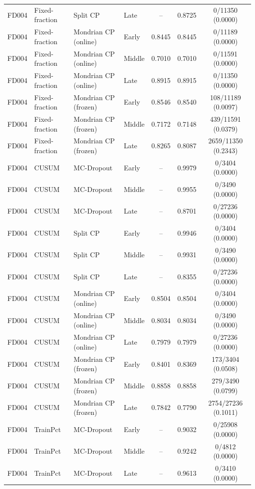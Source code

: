 \begin{table}[t]
\begin{tabular}{llllccc}
FD004 & Fixed-fraction & Split CP & Late & -- & 0.8725 & 0/11350 (0.0000) \\
FD004 & Fixed-fraction & Mondrian CP (online) & Early & 0.8445 & 0.8445 & 0/11189 (0.0000) \\
FD004 & Fixed-fraction & Mondrian CP (online) & Middle & 0.7010 & 0.7010 & 0/11591 (0.0000) \\
FD004 & Fixed-fraction & Mondrian CP (online) & Late & 0.8915 & 0.8915 & 0/11350 (0.0000) \\
FD004 & Fixed-fraction & Mondrian CP (frozen) & Early & 0.8546 & 0.8540 & 108/11189 (0.0097) \\
FD004 & Fixed-fraction & Mondrian CP (frozen) & Middle & 0.7172 & 0.7148 & 439/11591 (0.0379) \\
FD004 & Fixed-fraction & Mondrian CP (frozen) & Late & 0.8265 & 0.8087 & 2659/11350 (0.2343) \\
FD004 & CUSUM & MC-Dropout & Early & -- & 0.9979 & 0/3404 (0.0000) \\
FD004 & CUSUM & MC-Dropout & Middle & -- & 0.9955 & 0/3490 (0.0000) \\
FD004 & CUSUM & MC-Dropout & Late & -- & 0.8701 & 0/27236 (0.0000) \\
FD004 & CUSUM & Split CP & Early & -- & 0.9946 & 0/3404 (0.0000) \\
FD004 & CUSUM & Split CP & Middle & -- & 0.9931 & 0/3490 (0.0000) \\
FD004 & CUSUM & Split CP & Late & -- & 0.8355 & 0/27236 (0.0000) \\
FD004 & CUSUM & Mondrian CP (online) & Early & 0.8504 & 0.8504 & 0/3404 (0.0000) \\
FD004 & CUSUM & Mondrian CP (online) & Middle & 0.8034 & 0.8034 & 0/3490 (0.0000) \\
FD004 & CUSUM & Mondrian CP (online) & Late & 0.7979 & 0.7979 & 0/27236 (0.0000) \\
FD004 & CUSUM & Mondrian CP (frozen) & Early & 0.8401 & 0.8369 & 173/3404 (0.0508) \\
FD004 & CUSUM & Mondrian CP (frozen) & Middle & 0.8858 & 0.8858 & 279/3490 (0.0799) \\
FD004 & CUSUM & Mondrian CP (frozen) & Late & 0.7842 & 0.7790 & 2754/27236 (0.1011) \\
FD004 & TrainPct & MC-Dropout & Early & -- & 0.9032 & 0/25908 (0.0000) \\
FD004 & TrainPct & MC-Dropout & Middle & -- & 0.9242 & 0/4812 (0.0000) \\
FD004 & TrainPct & MC-Dropout & Late & -- & 0.9613 & 0/3410 (0.0000) \\

\end{tabular}
\end{table}
